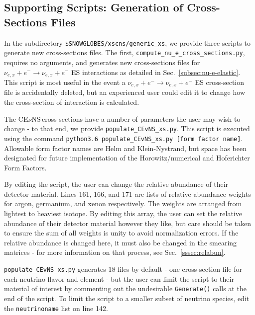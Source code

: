 \documentclass{article}
\newcommand{\cev}{CE$\nu$NS\,}
\begin{document}
\subsection{Supporting Scripts: Generation of Cross-Sections Files} \label{subsec:xsecsupportscripts}

In the subdirectory \texttt{\$SNOWGLOBES/xscns/generic\_xs}, we provide three scripts to generate new cross-sections files. The first, \texttt{compute\_nu\_e\_cross\_sections.py}, requires no arguments, and generates new cross-sections files for $\nu_{e,x} + e^- \rightarrow \nu_{e,x} + e^-$ ES interactions as detailed in Sec.~\ref{subsec:nu-e-elastic}. This script is most useful in the event a $\nu_{e,x} + e^- \rightarrow \nu_{e,x} + e^-$ ES cross-section file is accidentally deleted, but an experienced user could edit it to change how the cross-section of interaction is calculated.

The \cev cross-sections have a number of parameters the user may wish to change - to that end, we provide \texttt{populate\_CEvNS\_xs.py}. This script is executed using the command \texttt{python3.6 populate\_CEvNS\_xs.py [form factor name]}. Allowable form factor names are Helm and Klein-Nystrand, but space has been designated for future implementation of the Horowitz/numerical and Hoferichter Form Factors. 

By editing the script, the user can change the relative abundance of their detector material. Lines 161, 166, and 171 are lists of relative abundance weights for argon, germanium, and xenon respectively. The weights are arranged from lightest to heaviest isotope. By editing this array, the user can set the relative abundance of their detector material however they like, but care should be taken to ensure the sum of all weights is unity to avoid normalization errors. If the relative abundance is changed here, it must also be changed in the smearing matrices - for more information on that process, see Sec.~\ref{sssec:relabun}.

\texttt{populate\_CEvNS\_xs.py} generates 18 files by default - one cross-section file for each neutrino flavor and element - but the user can limit the script to their material of interest by commenting out the undesirable \texttt{Generate()} calls at the end of the script. To limit the script to a smaller subset of neutrino species, edit the \texttt{neutrinoname} list on line 142.
\end{document}
